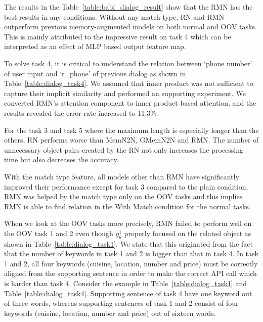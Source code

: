 \documentclass{article} \usepackage{iclr2018_conference,times}
\begin{document}
The results in the Table~\ref{table:babi_dialog_result} show that the RMN has the best results in any conditions.
Without any match type, RN and RMN outperform previous memory-augmented models on both normal and OOV tasks.
This is mainly attributed to the impressive result on task 4 which can be interpreted as an effect of MLP based output feature map.  

To solve task 4, it is critical to understand the relation between `phone number' of user input and `r\_phone' of previous dialog as shown in Table~\ref{table:dialog_task4}.
We assumed that inner product was not sufficient to capture their implicit similarity and performed an supporting experiment.
We converted RMN's attention component to inner product based attention, and the results revealed the error rate increased to 11.3\%.

For the task 3 and task 5 where the maximum length is especially longer than the others, RN performs worse than MemN2N, GMemN2N and RMN.
The number of unnecessary object pairs created by the RN not only increases the processing time but also decreases the accuracy. 


With the match type feature, all models other than RMN have significantly improved their performance except for task 3 compared to the plain condition.
RMN was helped by the match type only on the OOV tasks and this implies RMN is able to find relation in the With Match condition for the normal tasks.

\addtocounter{footnote}{-1}
\addtocounter{footnote}{+1}

When we look at the OOV tasks more precisely, RMN failed to perform well on the OOV task 1 and 2 even though $g_\theta^1$ properly focused on the related object as shown in Table~\ref{table:dialog_task1}.
We state that this originated from the fact that the number of keywords in task 1 and 2 is bigger than that in task 4.
In task 1 and 2, all four keywords (cuisine, location, number and price) must be correctly aligned from the supporting sentence in order to make the correct API call which is harder than task 4.
Consider the example in Table~\ref{table:dialog_task1} and Table~\ref{table:dialog_task4}.
Supporting sentence of task 4 have one keyword out of three words, whereas supporting sentences of task 1 and 2 consist of four keywords (cuisine, location, number and price) out of sixteen words. 
\end{document}
